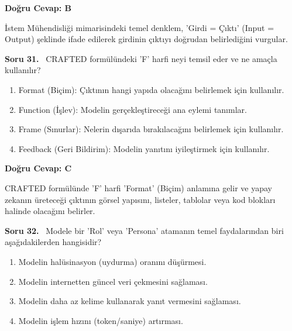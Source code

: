 \documentclass[11pt,a4paper,openany]{book}
\begin{document}
\vspace{4pt}
\begin{tcolorbox}[title=Cevap ve Açıklama, colback=gray!3!white, colframe=primarycolor!90!black, arc=2mm, fonttitle=\bfseries\sffamily, top=6pt, bottom=6pt]
    \textbf{Doğru Cevap: B}

    \vspace{2pt}
    İstem Mühendisliği mimarisindeki temel denklem, 'Girdi = Çıktı' (Input = Output) şeklinde ifade edilerek girdinin çıktıyı doğrudan belirlediğini vurgular.
\end{tcolorbox}
\vspace{10pt}
\needspace{5cm}
\vspace{8pt}
\noindent\textbf{\large\sffamily Soru 31.} \ CRAFTED formülündeki 'F' harfi neyi temsil eder ve ne amaçla kullanılır?

\begin{enumerate}[label=\Alph*), leftmargin=25pt, topsep=4pt, itemsep=2pt]
        \item Format (Biçim): Çıktının hangi yapıda olacağını belirlemek için kullanılır.
        \item Function (İşlev): Modelin gerçekleştireceği ana eylemi tanımlar.
        \item Frame (Sınurlar): Nelerin dışarıda bırakılacağını belirlemek için kullanılır.
        \item Feedback (Geri Bildirim): Modelin yanıtını iyileştirmek için kullanılır.
\end{enumerate}

\vspace{4pt}
\begin{tcolorbox}[title=Cevap ve Açıklama, colback=gray!3!white, colframe=primarycolor!90!black, arc=2mm, fonttitle=\bfseries\sffamily, top=6pt, bottom=6pt]
    \textbf{Doğru Cevap: C}

    \vspace{2pt}
    CRAFTED formülünde 'F' harfi 'Format' (Biçim) anlamına gelir ve yapay zekanın üreteceği çıktının görsel yapısını, listeler, tablolar veya kod blokları halinde olacağını belirler.
\end{tcolorbox}
\vspace{10pt}
\needspace{5cm}
\vspace{8pt}
\noindent\textbf{\large\sffamily Soru 32.} \ Modele bir 'Rol' veya 'Persona' atamanın temel faydalarından biri aşağıdakilerden hangisidir?

\begin{enumerate}[label=\Alph*), leftmargin=25pt, topsep=4pt, itemsep=2pt]
        \item Modelin halüsinasyon (uydurma) oranını düşürmesi.
        \item Modelin internetten güncel veri çekmesini sağlaması.
        \item Modelin daha az kelime kullanarak yanıt vermesini sağlaması.
        \item Modelin işlem hızını (token/saniye) artırması.
\end{enumerate}
\end{document}
